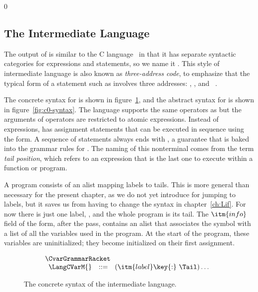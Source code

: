 \documentclass[7x10]{TimesAPriori_MIT}%
\def\racketEd{0}
\def\edition{0}
\numberwithin{theorem}{chapter}
\numberwithin{definition}{chapter}
\numberwithin{equation}{chapter}
\begin{document}
{\if\edition\racketEd  
\subsection{The \LangCVar{} Intermediate Language}

The output of  is similar to the C
language~\citep{Kernighan:1988nx} in that it has separate syntactic
categories for expressions and statements, so we name it \LangCVar{}.
This style of intermediate language is also known as
\emph{three-address code}, to emphasize that the typical form of a
statement such as  involves three
addresses: , , and ~\citep{Aho:2006wb}.

The concrete syntax for \LangCVar{} is shown in
figure~\ref{fig:c0-concrete-syntax}, and the abstract syntax for
\LangCVar{} is shown in figure~\ref{fig:c0-syntax}.
%
The \LangCVar{} language supports the same operators as \LangVar{} but
the arguments of operators are restricted to atomic
expressions. Instead of  expressions, \LangCVar{} has
assignment statements that can be executed in sequence using the
 form. A sequence of statements always ends with
, a guarantee that is baked into the grammar rules for
. The naming of this nonterminal comes from the term
\emph{tail position}, which refers to an
expression that is the last one to execute within a function or
program.

A \LangCVar{} program consists of an alist mapping labels to
tails. This is more general than necessary for the present chapter, as
we do not yet introduce  for jumping to labels, but it saves
us from having to change the syntax in chapter~\ref{ch:Lif}.  For now
there is just one label, , and the whole program is
its tail.
%
The $\itm{info}$ field of the  form, after the
 pass, contains an alist that associates the
symbol  with a list of all the variables used in the
program. At the start of the program, these variables are
uninitialized; they become initialized on their first assignment.

\begin{figure}[tbp]
\begin{tcolorbox}[colback=white]
\[
\begin{array}{l}
  \CvarGrammarRacket \\
\begin{array}{lcl}
\LangCVarM{} & ::= & (\itm{label}\key{:}~ \Tail)\ldots
\end{array}
\end{array}
\]
\end{tcolorbox}
\caption{The concrete syntax of the \LangCVar{} intermediate language.}
\label{fig:c0-concrete-syntax}
\end{figure}


}
\end{document}
